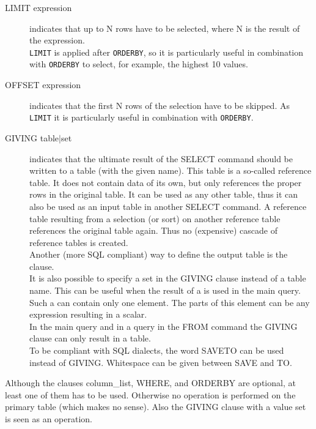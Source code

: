 \begin{description}
\begin{verbatim}
       \end{verbatim}
  \item[ LIMIT expression]
       indicates that up to N rows have to be selected, where N is
       the result of the expression. 
       \\\texttt{LIMIT} is applied after \texttt{ORDERBY}, so it is
       particularly useful in combination with
       \texttt{ORDERBY} to select, for example, the highest 10 values.
  \item[ OFFSET expression]
       indicates that the first N rows of the selection have to be 
       skipped. As \texttt{LIMIT} it is particularly useful in
       combination with \texttt{ORDERBY}.
  \item[ \label{TAQL:GIVING}GIVING table$|$set ]
       indicates that the ultimate result of the SELECT command should be
       written to a table (with the given name). This table is a
       so-called reference table.
       It does not contain data of its own, but only references the
       proper rows in the original table. It can be used
       as any other table, thus it can also be used as an input table in
       another SELECT command. A reference table resulting from
       a selection (or sort) on another reference table references the
       original table again. Thus no (expensive) cascade of reference
       tables is created.
       \\Another (more SQL compliant) way to define the output table
       is the  clause.
       \\It is also possible to specify a set in the GIVING clause
       instead of a table name. This can be useful when the result of a
        is used in the main query.
       Such a  can contain only one element.
       The parts of this element can be any expression resulting in a scalar.
       \\In the main query and in a query in the FROM command the
       GIVING clause can only result in a table.
       \\To be compliant with SQL dialects, the word SAVETO can be
       used instead of GIVING. Whitespace can be given between SAVE and TO.
 
\end{description}
Although the clauses column\_list, WHERE, and ORDERBY are optional,
at least one of them has to be used. Otherwise no operation is
performed on the primary table (which makes no sense).
Also the GIVING clause with a value set is seen as an operation.


